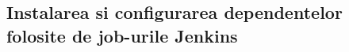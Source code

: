 \begin{comment}
The installer sets up Jenkins as a launch daemon, listening on port 8080. (If you want to know more about launchd and daemons, see here and here.)
Changing boot configuration

The launch daemon picks up the command line options from a standard preferences file, /Library/Preferences/org.jenkins-ci.plist. If the file does not exist, built-in defaults are used. The preference files are manipulated using the standard utility defaults.

    To view all settings in the file, run: defaults read /Library/Preferences/org.jenkins-ci
    To get the value of a single setting, run: defaults read /Library/Preferences/org.jenkins-ci SETTING
    To set the value of a setting, run: defaults write /Library/Preferences/org.jenkins-ci SETTING VALUE
    For more information, see man defaults

Supported Settings

The list of settings supported by the Jenkins launch daemon (see documentation):

    prefix
    httpPort
    httpListenAddress
    httpsPort
    httpsListenAddress
    ajp13Port
    ajp13ListenAddress

Additionally, you can set also these:

    war (Full path name to jenkins.war file.)
    heapSize (Passed to java command-line -Xmx parameter.)
    permGen (Passed to java command-line --XX:MaxPermSize parameter.)
    JENKINS_HOME (Full path to JENKINS_HOME directory where Jenkins keeps its files)

Starting/stopping the service
    To manually start the daemon: sudo launchctl load /Library/LaunchDaemons/org.jenkins-ci.plist
    To manually stop the daemon: sudo launchctl unload /Library/LaunchDaemons/org.jenkins-ci.plist

Inheriting your existing Hudson/Jenkins installation
    If you'd like your new installation to take over your existing Jenkins/Hudson data, copy your old data directory into the new JENKINS_HOME directory.
\end{comment}

\subsection{Instalarea si configurarea dependentelor folosite de job-urile Jenkins}

